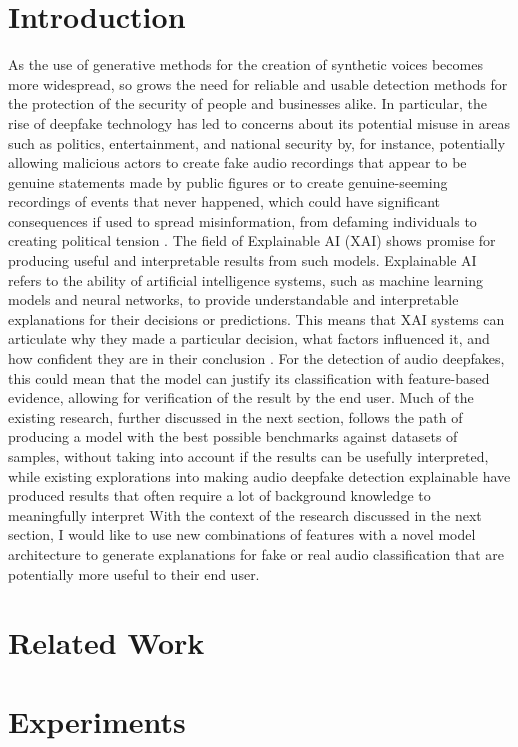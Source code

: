\documentclass{article}
\begin{document}
    \section{Introduction}
    As the use of generative methods for the creation of synthetic voices becomes more widespread,
    so grows the need for reliable and usable detection methods for the protection of the security
    of people and businesses alike. In particular, the rise of deepfake technology has led to
	concerns about its potential misuse in areas such as politics, entertainment, and national
	security by, for instance, potentially allowing malicious actors to create fake audio
	recordings that appear to be genuine statements made by public figures or to create
	genuine-seeming recordings of events that never happened, which could have significant
	consequences if used to spread misinformation, from defaming individuals to creating political
	tension \cite{veerasamy_rising_2022,albahar_deepfakes_2005}. The field of Explainable AI (XAI)
	shows promise for producing useful and interpretable results from such models. Explainable AI
	refers to the ability of artificial intelligence systems, such as machine learning models and
	neural networks, to provide understandable and interpretable explanations for their decisions
	or predictions. This means that XAI systems can articulate why they made a particular
	decision, what factors influenced it, and how confident they are in their conclusion
	\cite{hind_explaining_2019}. For the detection of audio deepfakes, this could mean that the
	model can justify its classification with feature-based evidence, allowing for verification of
	the result by the end user. Much of the existing research, further discussed in the next
	section, follows the path of producing a model with the best possible benchmarks against
	datasets of samples, without taking into account if the results can be usefully interpreted,
	while existing explorations into making audio deepfake detection explainable have produced
	results that often require a lot of background knowledge to meaningfully interpret With the
	context of the research discussed in the next section, I would like to use new combinations of
	features with a novel model architecture to generate explanations for fake or real audio
	classification that are potentially more useful to their end user.
	\section{Related Work}
	\section{Experiments}
\end{document}
